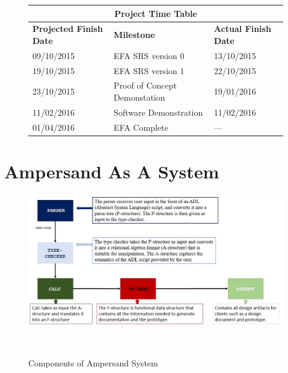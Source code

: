 \documentclass[12pt]{report}
\begin{document}
\newpage

\tableofcontents
\listoffigures
\listoftables

\newpage
{} %

\setlength{\arrayrulewidth}{0.35mm}
\setlength{\tabcolsep}{16pt}
\renewcommand{\arraystretch}{2}
\begin{figure}
	\begin{adjustwidth}{-1cm}{}
	\begin{tabular}{ |m{4cm}|m{6cm}|m{4cm}|  }
		\hline
		\multicolumn{3}{|c|}{\bfseries{Project Time Table}} \\
		\hline
		\bfseries{Projected Finish Date}& \bfseries{Milestone} & 
		\bfseries{Actual Finish Date} \\
		\hline
		 09/10/2015& EFA SRS version 0 & 13/10/2015 \\
		19/10/2015 & EFA SRS version 1  & 22/10/2015 \\
		23/10/2015 & Proof of Concept Demonstation & 19/01/2016 \\
		11/02/2016 & Software Demonstration & 11/02/2016 \\
		01/04/2016 & EFA Complete & --- \\
		\hline
	\end{tabular}
	\end{adjustwidth}
\end{figure}
\chapter{Ampersand As A System}\label{ch:Intro}

\begin{figure}[!htb]
\centering
\includegraphics[width=\textwidth]{../figures/ampersand_parts}
\caption{Components of Ampersand System}~\label{fig:AmpersandParts}
\end{figure}
\end{document}
